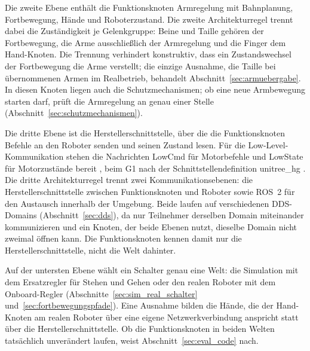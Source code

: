 Die zweite Ebene enthält die Funktionsknoten Armregelung mit Bahnplanung, Fortbewegung, Hände und Roboterzustand.
Die zweite Architekturregel trennt dabei die Zuständigkeit je Gelenkgruppe: Beine und Taille gehören der Fortbewegung, die Arme ausschließlich der Armregelung und die Finger dem Hand-Knoten.
Die Trennung verhindert konstruktiv, dass ein Zustandswechsel der Fortbewegung die Arme verstellt; die einzige Ausnahme, die Taille bei übernommenen Armen im Realbetrieb, behandelt Abschnitt~\ref{sec:armuebergabe}.
In diesen Knoten liegen auch die Schutzmechanismen; ob eine neue Armbewegung starten darf, prüft die Armregelung an genau einer Stelle (Abschnitt~\ref{sec:schutzmechanismen}).

Die dritte Ebene ist die Herstellerschnittstelle, über die die Funktionsknoten Befehle an den Roboter senden und seinen Zustand lesen.
Für die Low-Level-Kommunikation stehen die Nachrichten LowCmd für Motorbefehle und LowState für Motorzustände bereit \cite{UnitreeMujoco}, beim G1 nach der Schnittstellendefinition unitree\_hg \cite{UnitreeMujoco}.
Die dritte Architekturregel trennt zwei Kommunikationsebenen: die Herstellerschnittstelle zwischen Funktionsknoten und Roboter sowie ROS~2 für den Austausch innerhalb der Umgebung.
Beide laufen auf verschiedenen DDS-Domains (Abschnitt~\ref{sec:dds}), da nur Teilnehmer derselben Domain miteinander kommunizieren \cite{OMG2015} und ein Knoten, der beide Ebenen nutzt, dieselbe Domain nicht zweimal öffnen kann.
Die Funktionsknoten kennen damit nur die Herstellerschnittstelle, nicht die Welt dahinter.

Auf der untersten Ebene wählt ein Schalter genau eine Welt: die Simulation mit dem Ersatzregler für Stehen und Gehen oder den realen Roboter mit dem Onboard-Regler (Abschnitte~\ref{sec:sim_real_schalter} und~\ref{sec:fortbewegungspfade}).
Eine Ausnahme bilden die Hände, die der Hand-Knoten am realen Roboter über eine eigene Netzwerkverbindung anspricht statt über die Herstellerschnittstelle.
Ob die Funktionsknoten in beiden Welten tatsächlich unverändert laufen, weist Abschnitt~\ref{sec:eval_code} nach.

